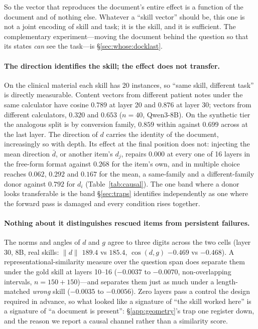 \documentclass{article}
\newcommand{\dvec}{\ensuremath{d}}
\newcommand{\gvec}{\ensuremath{g}}
\begin{document}
So the vector that reproduces the document's entire effect is a function of the
document and of nothing else. Whatever a ``skill vector'' should be, this one is
not a joint encoding of skill and task; it is the skill, and it is sufficient.
The complementary experiment---moving the document behind the question so that
its states \emph{can} see the task---is \S\ref{sec:whose:docklast}.

\paragraph{The direction identifies the skill; the effect does not transfer.}
On the clinical material each skill has 20 instances, so ``same skill, different
task'' is directly measurable. Content vectors from different patient notes under
the same calculator have cosine $0.789$ at layer 20 and $0.876$ at layer 30;
vectors from different calculators, $0.320$ and $0.653$ ($n=40$, Qwen3-8B). On
the synthetic tier the analogous split is by conversion family, $0.859$ within
against $0.699$ across at the last layer. The direction of $\dvec$ carries the
identity of the document, increasingly so with depth. Its effect at the final
position does not: injecting the mean direction $\bar{\dvec}$, or another item's
$\dvec_j$, repairs $0.000$ at every one of 16 layers in the free-form format
against $0.268$ for the item's own, and in multiple choice reaches $0.062$,
$0.292$ and $0.167$ for the mean, a same-family and a different-family donor
against $0.792$ for $\dvec_i$ (Table~\ref{tab:causal}). The one band where a
donor looks transferable is the band \S\ref{sec:traps} identifies independently
as one where the forward pass is damaged and every condition rises together.

\paragraph{Nothing about it distinguishes rescued items from persistent
failures.} The norms and angles of $\dvec$ and $\gvec$ agree to three digits
across the two cells (layer 30, 8B, real skills: $\|\dvec\|$ $189.4$ vs $185.4$,
$\cos(\dvec,\gvec)$ $-0.469$ vs $-0.468$). A representational-similarity measure
over the question span does separate them under the gold skill at layers 10--16
($-0.0037$ to $-0.0070$, non-overlapping intervals, $n=150+150$)---and separates
them just as much under a length-matched \emph{wrong} skill ($-0.0035$ to
$-0.0056$). Zero layers pass a control the design required in advance, so what
looked like a signature of ``the skill worked here'' is a signature of ``a
document is present'': \S\ref{app:geometry}'s trap one register down, and the
reason we report a causal channel rather than a similarity score.
\end{document}
